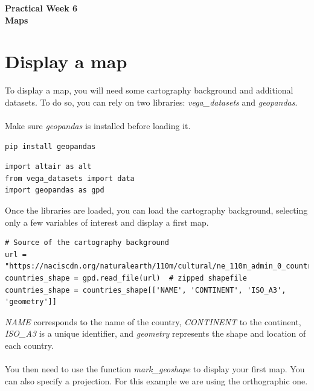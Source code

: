 \documentclass[11pt]{article}
\begin{document}
\pagestyle{fancy}
\renewcommand{\headrulewidth}{0pt}

\begin{center}
\vspace*{1cm}
{\textbf {\Huge Practical Week 6}}\\
\vspace*{0.5cm}
{\textbf {\huge Maps}}
\vspace*{1cm}
\end{center}


\section{Display a map}

To display a map, you will need some cartography background and additional datasets. To do so, you can rely on two libraries: \textit{vega\_datasets} and \textit{geopandas}.\\
\\
Make sure \textit{geopandas} is installed before loading it.

\begin{verbatim}
pip install geopandas
\end{verbatim}

\begin{verbatim}
import altair as alt
from vega_datasets import data
import geopandas as gpd
\end{verbatim}

Once the libraries are loaded, you can load the cartography background, selecting only a few variables of interest and display a first map.

\begin{verbatim}
# Source of the cartography background
url = "https://naciscdn.org/naturalearth/110m/cultural/ne_110m_admin_0_countries.zip"
countries_shape = gpd.read_file(url)  # zipped shapefile
countries_shape = countries_shape[['NAME', 'CONTINENT', 'ISO_A3', 'geometry']]
\end{verbatim}

\textit{NAME} corresponds to the name of the country, \textit{CONTINENT} to the continent, \textit{ISO\_A3} is a unique identifier, and \textit{geometry} represents the shape and location of each country.\\
\\
You then need to use the function \textit{mark\_geoshape} to display your first map. You can also specify a projection. For this example we are using the orthographic one.
\end{document}
